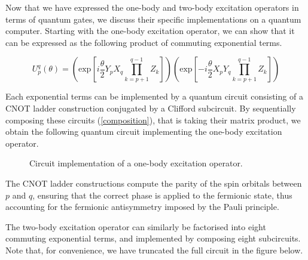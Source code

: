 Now that we have expressed the one-body and two-body excitation operators in terms of quantum gates, we discuss their specific implementations on a quantum computer. Starting with the one-body excitation operator, we can show that it can be expressed as the following product of commuting exponential terms.

\begin{equation*}
    U^q_p (\theta) =
    \left( \text{exp} \left[
    i \frac{\theta}{2} Y_p X_q \prod_{k=p+1}^{q-1} Z_k \right] \right)
    \left( \text{exp} \left[ -
    i \frac{\theta}{2} X_p Y_q \prod_{k=p+1}^{q-1} Z_k \right] \right)
\end{equation*}

Each exponential terms can be implemented by a quantum circuit consisting of a CNOT ladder construction conjugated by a Clifford subcircuit. By sequentially composing these circuits (\ref{composition}), that is taking their matrix product, we obtain the following quantum circuit implementing the one-body excitation operator.





\begin{figure}[H]
    \centering
    \caption{Circuit implementation of a one-body excitation operator.}
    \label{one-body-implementation}
\end{figure}

The CNOT ladder constructions compute the parity of the spin orbitals between $p$ and $q$, ensuring that the correct phase is applied to the fermionic state, thus accounting for the fermionic antisymmetry imposed by the Pauli principle.

The two-body excitation operator can similarly be factorised into eight commuting exponential terms, and implemented by composing eight subcircuits. Note that, for convenience, we have truncated the full circuit in the figure below.

